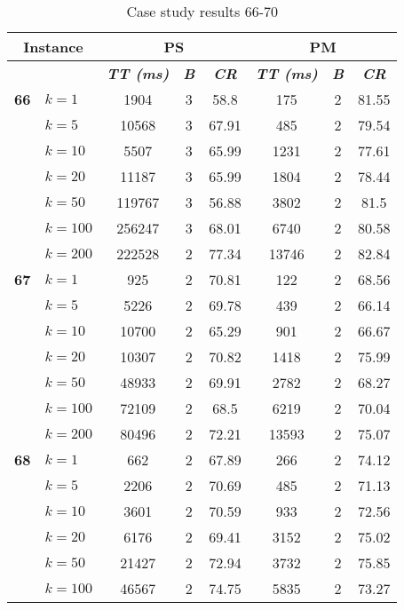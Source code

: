     \begin{table}[htbp]
    \caption{Case study results 66-70}
    \centering
    \begin{tabular}{|l|l|c|c|c|c|c|c|}
    \hline
    \multicolumn{ 2}{|c|}{\textbf{Instance}} & \multicolumn{ 3}{c|}{\textbf{PS}} & \multicolumn{ 3}{c|}{\textbf{PM}} \\ \hline
    \multicolumn{ 2}{|l|}{} & \textbf{\textit{TT (ms)}} & \textbf{\textit{B}} & \textbf{\textit{CR}} & \textbf{\textit{TT (ms)}} & \textbf{\textit{B}} & \textbf{\textit{CR}} \\ \hline
    \multicolumn{1}{|r|}{\textbf{66}} & $k=1$ & 1904 & 3 & 58.8 & 175 & 2 & 81.55 \\ 
     & $k=5$ & 10568 & 3 & 67.91 & 485 & 2 & 79.54 \\ 
     & $k=10$ & 5507 & 3 & 65.99 & 1231 & 2 & 77.61 \\ 
     & $k=20$ & 11187 & 3 & 65.99 & 1804 & 2 & 78.44 \\ 
     & $k=50$ & 119767 & 3 & 56.88 & 3802 & 2 & 81.5 \\ 
     & $k=100$ & 256247 & 3 & 68.01 & 6740 & 2 & 80.58 \\ 
     & $k=200$ & 222528 & 2 & 77.34 & 13746 & 2 & 82.84 \\ \hline
    \multicolumn{1}{|r|}{\textbf{67}} & $k=1$ & 925 & 2 & 70.81 & 122 & 2 & 68.56 \\ 
     & $k=5$ & 5226 & 2 & 69.78 & 439 & 2 & 66.14 \\ 
     & $k=10$ & 10700 & 2 & 65.29 & 901 & 2 & 66.67 \\ 
     & $k=20$ & 10307 & 2 & 70.82 & 1418 & 2 & 75.99 \\ 
     & $k=50$ & 48933 & 2 & 69.91 & 2782 & 2 & 68.27 \\ 
     & $k=100$ & 72109 & 2 & 68.5 & 6219 & 2 & 70.04 \\ 
     & $k=200$ & 80496 & 2 & 72.21 & 13593 & 2 & 75.07 \\ \hline
    \multicolumn{1}{|r|}{\textbf{68}} & $k=1$ & 662 & 2 & 67.89 & 266 & 2 & 74.12 \\ 
     & $k=5$ & 2206 & 2 & 70.69 & 485 & 2 & 71.13 \\ 
     & $k=10$ & 3601 & 2 & 70.59 & 933 & 2 & 72.56 \\ 
     & $k=20$ & 6176 & 2 & 69.41 & 3152 & 2 & 75.02 \\ 
     & $k=50$ & 21427 & 2 & 72.94 & 3732 & 2 & 75.85 \\ 
     & $k=100$ & 46567 & 2 & 74.75 & 5835 & 2 & 73.27 \\ 

\end{tabular}
\end{table}
